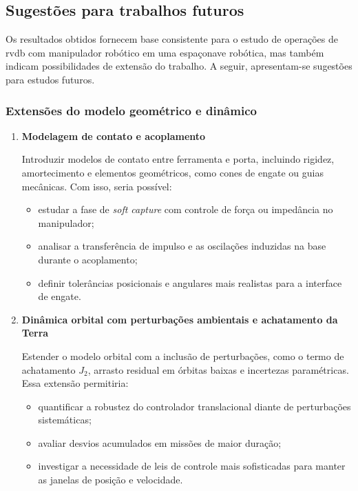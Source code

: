 \subsection{Sugestões para trabalhos futuros}
\label{sec:cap5_trabalhos_futuros}

Os resultados obtidos fornecem base consistente para o estudo de operações de \gls{rvdb} com manipulador robótico em uma espaçonave robótica, mas também indicam possibilidades de extensão do trabalho.
A seguir, apresentam-se sugestões para estudos futuros.

\subsubsection{Extensões do modelo geométrico e dinâmico}

\begin{enumerate}[label=(\alph*)]

    \item \textbf{Modelagem de contato e acoplamento}

    Introduzir modelos de contato entre ferramenta e porta, incluindo rigidez, amortecimento e elementos geométricos, como cones de engate ou guias mecânicas.
    Com isso, seria possível:
    \begin{itemize}
        \item estudar a fase de \emph{soft capture} com controle de força ou impedância no manipulador;
        \item analisar a transferência de impulso e as oscilações induzidas na base durante o acoplamento;
        \item definir tolerâncias posicionais e angulares mais realistas para a interface de engate.
    \end{itemize}

    \item \textbf{Dinâmica orbital com perturbações ambientais e achatamento da Terra}

    Estender o modelo orbital com a inclusão de perturbações, como o termo de achatamento $J_2$, arrasto residual em órbitas baixas e incertezas paramétricas.
    Essa extensão permitiria:
    \begin{itemize}
        \item quantificar a robustez do controlador translacional diante de perturbações sistemáticas;
        \item avaliar desvios acumulados em missões de maior duração;
        \item investigar a necessidade de leis de controle mais sofisticadas para manter as janelas de posição e velocidade.
    \end{itemize}

\end{enumerate}

